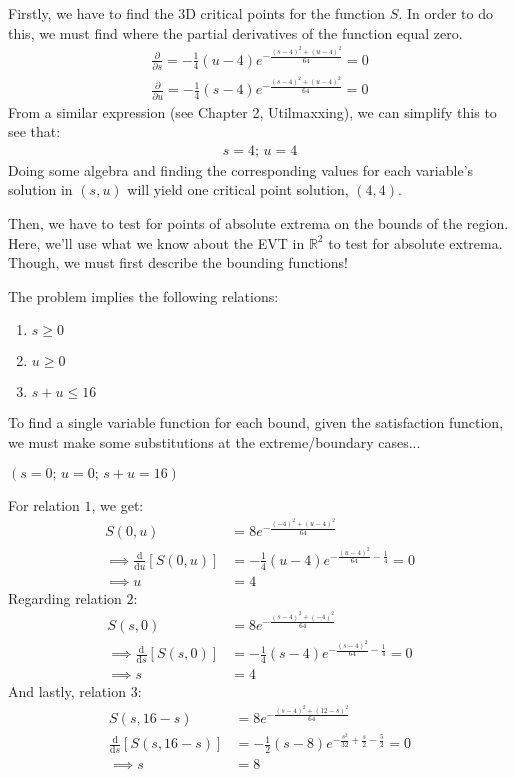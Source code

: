 Firstly, we have to find the $3$D critical points for the function $S$.
In order to do this, we must find where the partial derivatives of the function equal zero.
\begin{align*}
	\frac{\partial}{\partial s} = -\frac{1}{4}(u-4)e^{-\frac{(s-4)^2+(u-4)^2}{64}}=0\\
	\frac{\partial}{\partial u} = -\frac{1}{4}(s-4)e^{-\frac{(s-4)^2+(u-4)^2}{64}}=0
\end{align*}
From a similar expression (see Chapter 2, Utilmaxxing), we can simplify this to see that:
\begin{align*}
	s = 4\text{; }u = 4
\end{align*}
Doing some algebra and finding the corresponding values for each variable's solution in $(s, u)$ will yield one critical point solution, $(4, 4)$.

Then, we have to test for points of absolute extrema on the bounds of the region.
Here, we'll use what we know about the EVT in $\mathbb{R}^2$ to test for absolute extrema.
Though, we must first describe the bounding functions!

The problem implies the following relations:
\begin{enumerate}
	\item $s\geq 0$
	\item $u\geq 0$
	\item $s+u\leq 16$
\end{enumerate}

To find a single variable function for each bound, given the satisfaction function, we must make some substitutions at the extreme/boundary cases...
\begin{center}
	$(s=0\text{; }u=0\text{; }s+u=16)$
\end{center}
For relation $1$, we get:
\begin{align*}
	S(0, u)&=8e^{-\frac{(-4)^2+(u-4)^2}{64}}\\
	\implies \frac{\mathrm{d}}{\mathrm{d}u}[S(0,u)]&=-\frac{1}{4}(u-4)e^{-\frac{(u-4)^2}{64}-\frac{1}{4}}=0\\
	\implies u&=4
\end{align*}
Regarding relation $2$:
\begin{align*}
	S(s, 0)&=8e^{-\frac{(s-4)^2+(-4)^2}{64}}\\
	\implies \frac{\mathrm{d}}{\mathrm{d}s}[S(s,0)]&=-\frac{1}{4}(s-4)e^{-\frac{(s-4)^2}{64}-\frac{1}{4}}=0\\
	\implies s&=4
\end{align*}
And lastly, relation $3$:
\begin{align*}
	S(s, 16-s)&=8e^{-\frac{(s-4)^2+(12-s)^2}{64}}\\
	\frac{\mathrm{d}}{\mathrm{d}s}[S(s,16-s)]&=-\frac{1}{2}(s-8)e^{-\frac{s^2}{32}+\frac{s}{2}-\frac{5}{2}}=0\\
	\implies s&=8
\end{align*}

